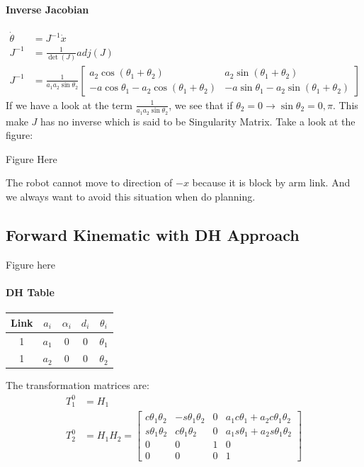 \paragraph{Inverse Jacobian}
\begin{equation}
	\begin{split}
		\dot{\theta} &= J^{-1}\dot{x}\\
		J^{-1} &= \frac{1}{\det(J)} adj(J)\\
		J^{-1} &= \frac{1}{a_1a_2\sin\theta_2}
		\begin{bmatrix}
			a_2\cos(\theta_1+\theta_2) & a_2\sin(\theta_1+\theta_2) \\
			-a \cos\theta_1-a_2\cos(\theta_1+\theta_2) & -a\sin\theta_1-a_2\sin(\theta_1+\theta_2)
		\end{bmatrix}
	\end{split}
\end{equation}
If we have a look at the term \(\frac{1}{a_1a_2\sin\theta_2}\), we see that if $\theta_2 = 0 \rightarrow \sin\theta_2 = 0 , \pi$. This make $J$ has no inverse which is said to be Singularity Matrix. Take a look at the figure:

Figure Here

The robot cannot move to direction of $-x$ because it is block by arm link. And we always want to avoid this situation when do planning.

\subsection{Forward Kinematic with DH Approach}
Figure here
\paragraph{DH Table}

\begin{tabular}{|c|c|c|c|c|}
	\hline
	Link & $a_i$ & $\alpha_i$ & $d_i$ & $\theta_i$ \\
	\hline
	1 & $a_1$ & 0 & 0 & $\theta_1$ \\
	1 & $a_2$ & 0 & 0 & $\theta_2$ \\
	\hline
\end{tabular}

The transformation matrices are:
\[
\begin{split}
	T_1^0 &= H_1 \\
	T_2^0 &= H_1H_2 = 
	\begin{bmatrix}
		c\theta_1\theta_2 & -s\theta_1\theta_2 & 0 & a_1c\theta_1+a_2c\theta_1\theta_2\\
		s\theta_1\theta_2 & c\theta_1\theta_2 & 0 & a_1s\theta_1+a_2s\theta_1\theta_2\\
		0 & 0 & 1 & 0\\
		0 & 0 & 0 & 1
	\end{bmatrix}
\end{split}
\]